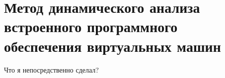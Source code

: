 \section{Метод динамического анализа встроенного программного обеспечения виртуальных машин}
Что я непосредственно сделал?
